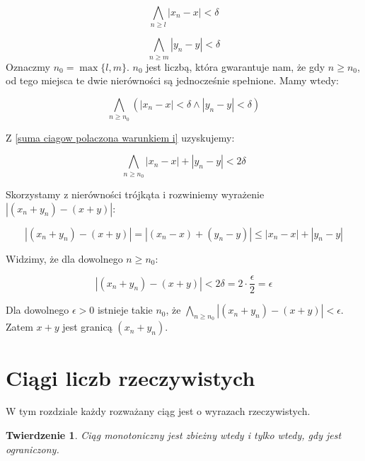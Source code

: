 \documentclass[a4paper,oneside,openright,11pt]{article}
\newtheorem{theorem}{Twierdzenie}
\numberwithin{equation}{section}
\begin{document}
\begin{equation*}
    \bigwedge_{n \geq l} |x_{n} - x| < \delta 
\end{equation*}

\begin{equation*}
    \bigwedge_{n \geq m} |y_{n} - y| < \delta 
\end{equation*}
Oznaczmy $n_0 = \max \{l, m\}$. $n_0$ jest liczbą, która gwarantuje nam, że gdy $n \geq n_0$, od tego miejsca te dwie nierówności
są jednocześnie spełnione. Mamy wtedy:

\begin{equation} \label{suma ciagow polaczona warunkiem i}
    \bigwedge_{n \geq n_0} (|x_{n} - x| < \delta \wedge |y_{n} - y| < \delta)
\end{equation}


Z \ref{suma ciagow polaczona warunkiem i} uzyskujemy:

\begin{equation} \label{mniejsze niz dwa delta}
    \bigwedge_{n \geq n_0} |x_n - x| + |y_n - y| < 2 \delta
\end{equation}

Skorzystamy z nierówności trójkąta i rozwiniemy wyrażenie $|(x_{n} + y_{n}) - (x + y)|$:

\begin{equation*}
    |(x_{n} + y_{n}) - (x + y)| = |(x_{n} - x) + (y_{n} - y)| \leq |x_n - x| + |y_n - y| 
\end{equation*}

Widzimy, że dla dowolnego $n \geq n_0$:

\begin{equation*}
    |(x_{n} + y_{n}) - (x + y)| < 2 \delta = 2 \cdot \frac{\epsilon}{2} = \epsilon
\end{equation*}

\vspace{10mm}
Dla dowolnego $\epsilon > 0$ istnieje takie $n_0$, że $\underset{n \geq n_0}{\bigwedge} |(x_{n} + y_{n}) - (x + y)| < \epsilon$. Zatem $x+y$
jest granicą $(x_{n} + y_{n})$.


\section{Ciągi liczb rzeczywistych}

W tym rozdziale każdy rozważany ciąg jest o wyrazach rzeczywistych.

\begin{theorem}
    
    Ciąg monotoniczny jest zbieżny wtedy i tylko wtedy, gdy jest ograniczony.

\end{theorem}
\end{document}
